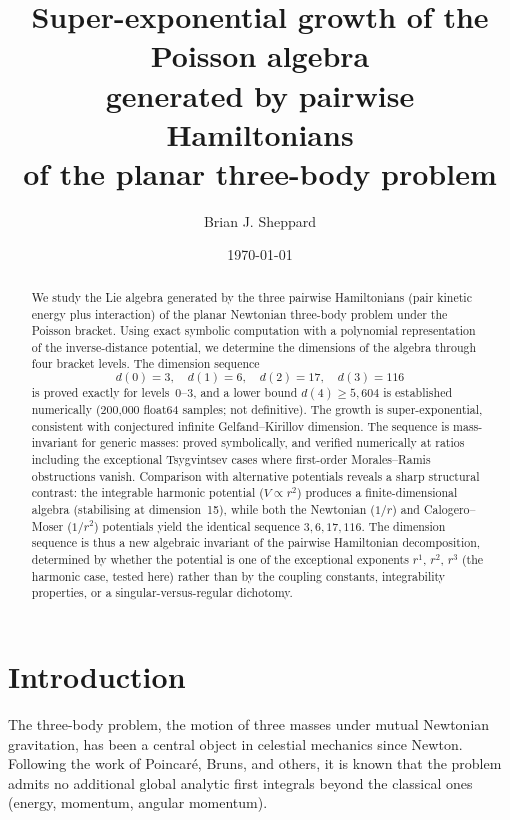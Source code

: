 \documentclass[11pt,a4paper]{article}
\title{Super-exponential growth of the Poisson algebra\\
generated by pairwise Hamiltonians\\
of the planar three-body problem}
\author{Brian J. Sheppard}
\date{\today}
\theoremstyle{remark}
\begin{document}
\maketitle

\begin{abstract}
We study the Lie algebra generated by the three pairwise
Hamiltonians (pair kinetic energy plus interaction) of the
planar Newtonian three-body problem under the Poisson bracket.  Using exact symbolic
computation with a polynomial representation of the
inverse-distance potential, we determine the dimensions of the
algebra through four bracket levels.  The dimension sequence
\[
  d(0)=3,\quad d(1)=6,\quad d(2)=17,\quad d(3)=116
\]
is proved exactly for levels~0--3, and a lower bound
$d(4) \ge 5{,}604$ is established numerically (200{,}000
float64 samples; not definitive).
The growth is super-exponential, consistent with
conjectured infinite Gelfand--Kirillov dimension.  The sequence
is mass-invariant for generic masses: proved symbolically,
and verified numerically at ratios including the exceptional
Tsygvintsev cases where first-order Morales--Ramis obstructions
vanish.  Comparison with alternative potentials
reveals a sharp structural contrast: the integrable harmonic
potential ($V \propto r^2$) produces a finite-dimensional
algebra (stabilising at dimension~15), while both the
Newtonian ($1/r$) and Calogero--Moser ($1/r^2$) potentials
yield the identical sequence $3, 6, 17, 116$.  The dimension
sequence is thus a new algebraic invariant of the pairwise
Hamiltonian decomposition, determined by whether the potential
is one of the exceptional exponents $r^1$, $r^2$, $r^3$ (the
harmonic case, tested here) rather than by the coupling
constants, integrability properties, or a singular-versus-regular
dichotomy.
\end{abstract}


\section{Introduction}

The three-body problem, the motion of three masses under mutual
Newtonian gravitation, has been a central object in
celestial mechanics since Newton.  Following the work of
Poincar\'{e}, Bruns, and others, it is known that the problem
admits no additional global analytic first integrals beyond the
classical ones (energy, momentum, angular momentum).
\end{document}
